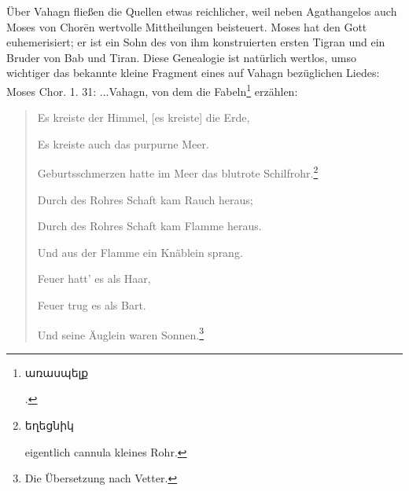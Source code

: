 \documentclass{article}
\begin{document}
Über Vahagn fließen die Quellen etwas reichlicher, weil neben Agathangelos auch Moses von Chorēn wertvolle Mittheilungen beisteuert. Moses hat den Gott euhemerisiert; er ist ein Sohn des von ihm konstruierten ersten Tigran und ein Bruder von Bab und Tiran. Diese Genealogie ist natürlich wertlos, umso wichtiger das bekannte kleine Fragment eines auf Vahagn bezüglichen Liedes: Moses Chor. 1. 31: ...Vahagn, von dem die Fabeln\footnote{\begin{armenian}առասպելք\end{armenian}.} erzählen:
\begin{quotation}
\small
Es kreiste der Himmel, [es kreiste] die Erde,

Es kreiste auch das purpurne Meer.

Geburtsschmerzen hatte im Meer das blutrote Schilfrohr.\footnote{\begin{armenian}եղեցնիկ\end{armenian} eigentlich cannula kleines Rohr.}

Durch des Rohres Schaft kam Rauch heraus;

Durch des Rohres Schaft kam Flamme heraus.

Und aus der Flamme ein Knäblein sprang.

Feuer hatt' es als Haar,

Feuer trug es als Bart.

Und seine Äuglein waren Sonnen.\footnote{Die Übersetzung nach Vetter.}
\end{quotation}
\end{document}
